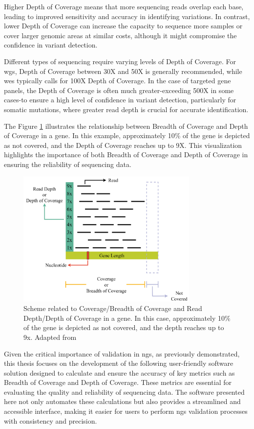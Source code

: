 Higher Depth of Coverage means that more sequencing reads overlap each base, leading to improved sensitivity and accuracy in identifying variations. In contrast, lower Depth of Coverage can increase the capacity to sequence more samples or cover larger genomic areas at similar costs, although it might compromise the confidence in variant detection. \cite{Larson2023}

Different types of sequencing require varying levels of Depth of Coverage. For \ac{wgs}, Depth of Coverage between 30X and 50X is generally recommended, while \ac{wes} typically calls for 100X Depth of Coverage. In the case of targeted gene panels, the Depth of Coverage is often much greater-exceeding 500X in some cases-to ensure a high level of confidence in variant detection, particularly for somatic mutations, where greater read depth is crucial for accurate identification. \cite{Larson2023}

The Figure \ref{fig:depth_coverage} illustrates the relationship between Breadth of Coverage and Depth of Coverage in a gene. In this example, approximately 10\% of the gene is depicted as not covered, and the Depth of Coverage reaches up to 9X. This visualization highlights the importance of both Breadth of Coverage and Depth of Coverage in ensuring the reliability of sequencing data.

\begin{figure}[H]
    \centering
    \includegraphics[width=0.8\textwidth]{figs/depth_coverage.png}
    \caption{Scheme related to Coverage/Breadth of Coverage and Read Depth/Depth of Coverage in a gene. In this case, approximately 10\% of the gene is depicted as not covered, and the depth reaches up to 9x. Adapted from \cite{MedGenome2020}} 
    \label{fig:depth_coverage}
\end{figure}

Given the critical importance of validation in \ac{ngs}, as previously demonstrated, this thesis focuses on the development of the following user-friendly software solution designed to calculate and ensure the accuracy of key metrics such as Breadth of Coverage and Depth of Coverage. These metrics are essential for evaluating the quality and reliability of sequencing data. The software presented here not only automates these calculations but also provides a streamlined and accessible interface, making it easier for users to perform \ac{ngs} validation processes with consistency and precision.
